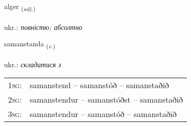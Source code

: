 \documentclass[frontgrid, backgrid]{flacards}\usepackage[]{graphicx}\usepackage[]{xcolor}
\begin{document}
\renewcommand{\blhead}{\vskip5pt {\small\bfseries\footnotesize Lýsingarorð | прикметник }}
\renewcommand{\bcfoot}{\vskip5pt \hspace{2pt}{\small\bfseries\footnotesize 3K}}


{alger \small{\textsubscript{(\textit{adj.})}} \\[1ex] %
\textphonetic{[alcɛr]} \\
ukr.: \emph{повністю; абсолтно} \\  [2ex]
\renewcommand*{\arraystretch}{0.8}
}

\renewcommand{\flhead}{\vskip5pt \fboxsep=0pt {\small\bfseries\footnotesize Sagnorð | дієслово}}
\renewcommand{\fcfoot}{\vskip5pt \fboxsep=0pt \hspace{2pt}{\small\bfseries\footnotesize 3K}}

\renewcommand{\blhead}{\vskip5pt {\small\bfseries\footnotesize Sagnorð | дієслово }}
\renewcommand{\bcfoot}{\vskip5pt \hspace{2pt}{\small\bfseries\footnotesize 3K}}


{samanstanda \small{\textsubscript{(\textit{v.})}} \\[1ex] %
\textphonetic{[saːmanstanta]} \\
ukr.: \emph{складатися з} \\  [2ex]
\renewcommand*{\arraystretch}{0.8}
\begin{tabular}{p{1cm}l}
\textsc{1sg}: & samanstend -- samanstóð -- samanstaðið \\ 
\textsc{2sg}: & samanstendur -- samanstóðst -- samanstaðið \\ 
\textsc{3sg}: & samanstendur -- samanstóð -- samanstaðið \\ 
\end{tabular}
}
\end{document}

